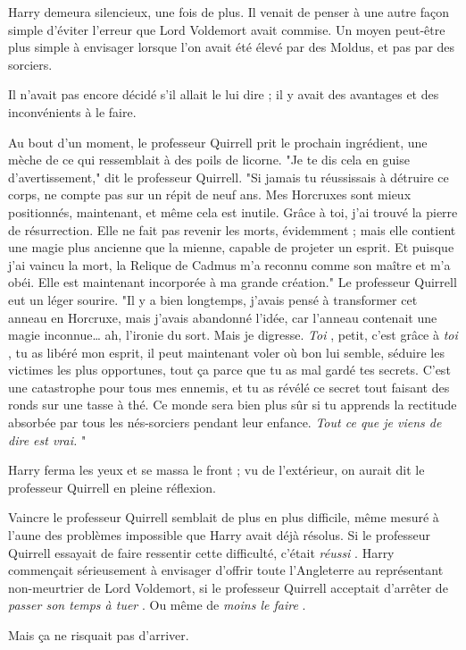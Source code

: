 Harry demeura silencieux, une fois de plus. Il venait de penser à une autre façon simple d'éviter l'erreur que Lord Voldemort avait commise. Un moyen peut-être plus simple à envisager lorsque l'on avait été élevé par des Moldus, et pas par des sorciers.

Il n'avait pas encore décidé s'il allait le lui dire ; il y avait des avantages et des inconvénients à le faire.

Au bout d'un moment, le professeur Quirrell prit le prochain ingrédient, une mèche de ce qui ressemblait à des poils de licorne. "Je te dis cela en guise d'avertissement," dit le professeur Quirrell. "Si jamais tu réussissais à détruire ce corps, ne compte pas sur un répit de neuf ans. Mes Horcruxes sont mieux positionnés, maintenant, et même cela est inutile. Grâce à toi, j'ai trouvé la pierre de résurrection. Elle ne fait pas revenir les morts, évidemment ; mais elle contient une magie plus ancienne que la mienne, capable de projeter un esprit. Et puisque j'ai vaincu la mort, la Relique de Cadmus m'a reconnu comme son maître et m'a obéi. Elle est maintenant incorporée à ma grande création." Le professeur Quirrell eut un léger sourire. "Il y a bien longtemps, j'avais pensé à transformer cet anneau en Horcruxe, mais j'avais abandonné l'idée, car l'anneau contenait une magie inconnue… ah, l'ironie du sort. Mais je digresse. \emph{Toi} , petit, c'est grâce à \emph{toi} , tu as libéré mon esprit, il peut maintenant voler où bon lui semble, séduire les victimes les plus opportunes, tout ça parce que tu as mal gardé tes secrets. C'est une catastrophe pour tous mes ennemis, et tu as révélé ce secret tout faisant des ronds sur une tasse à thé. Ce monde sera bien plus sûr si tu apprends la rectitude absorbée par tous les nés-sorciers pendant leur enfance. \emph{Tout ce que je viens de dire est vrai.} "

Harry ferma les yeux et se massa le front ; vu de l'extérieur, on aurait dit le professeur Quirrell en pleine réflexion.

Vaincre le professeur Quirrell semblait de plus en plus difficile, même mesuré à l'aune des problèmes impossible que Harry avait déjà résolus. Si le professeur Quirrell essayait de faire ressentir cette difficulté, c'était \emph{réussi} . Harry commençait sérieusement à envisager d'offrir toute l'Angleterre au représentant non-meurtrier de Lord Voldemort, si le professeur Quirrell acceptait d'arrêter de \emph{passer son temps à tuer} . Ou même de \emph{moins le faire} .

Mais ça ne risquait pas d'arriver.

